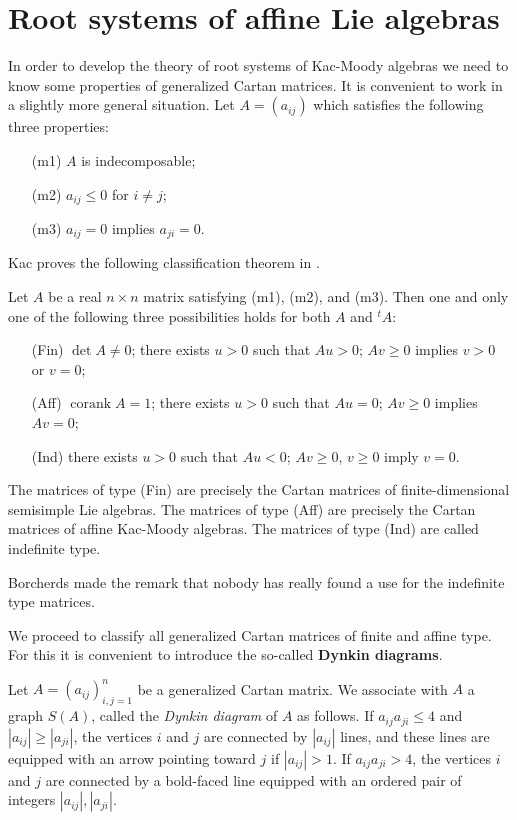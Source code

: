 \documentclass[12pt]{article}
\begin{document}
\begin{exercise}
\end{exercise}

\section{Root systems of affine Lie algebras}
In order to develop the theory of root systems of Kac-Moody algebras we need to know some properties of generalized Cartan matrices. It is convenient to work in a slightly more general situation. Let $A = (a_{ij})$ which satisfies the following three properties:
\begin{itemize}
    \item[(m1)] $A$ is indecomposable;
    \item[(m2)] $a_{ij} \leq 0$ for $i \neq j$;
    \item[(m3)] $a_{ij} = 0$ implies $a_{ji} = 0$.
\end{itemize}
Kac proves the following classification theorem in \cite{kac}.
\begin{theorem}
    Let $A$ be a real $n \times n$ matrix satisfying (m1), (m2), and (m3). Then one and only one of the following three possibilities holds for both $A$ and ${}^t A$:
    \begin{itemize}
        \item[(Fin)] $\det A \neq 0$; there exists $u > 0$ such that $Au > 0$; $Av \geq 0$ implies $v > 0$ or $v = 0$;
        \item[(Aff)] $\operatorname{corank} A = 1$; there exists $u > 0$ such that $Au = 0$; $Av \geq 0$ implies $Av = 0$;
        \item[(Ind)] there exists $u > 0$ such that $Au < 0$; $Av \geq 0$, $v \geq 0$ imply $v = 0$.
    \end{itemize}
\end{theorem}

\begin{remark}
    The matrices of type (Fin) are precisely the Cartan matrices of finite-dimensional semisimple Lie algebras. The matrices of type (Aff) are precisely the Cartan matrices of affine Kac-Moody algebras. The matrices of type (Ind) are called indefinite type.

    Borcherds made the remark that nobody has really found a use for the indefinite type matrices.
\end{remark}

We proceed to classify all generalized Cartan matrices of finite and affine type. 
For this it is convenient to introduce the so-called \textbf{Dynkin diagrams}. 
\begin{definition}
    Let $A=(a_{ij})_{i,j=1}^n$ be a generalized Cartan matrix.  We associate with $A$ a graph $S(A)$, called the \emph{Dynkin diagram} of $A$ as follows. If $a_{ij}a_{ji}\leq 4$ and $|a_{ij}|\geq |a_{ji}|$, the vertices $i$ and $j$ are connected by $|a_{ij}|$ lines, and these lines are equipped with an arrow pointing toward $j$ if $|a_{ij}|>1$. 
If $a_{ij}a_{ji}>4$, the vertices $i$ and $j$ are connected by a bold-faced line 
equipped with an ordered pair of integers $|a_{ij}|,|a_{ji}|$. 
\end{definition}
\end{document}
